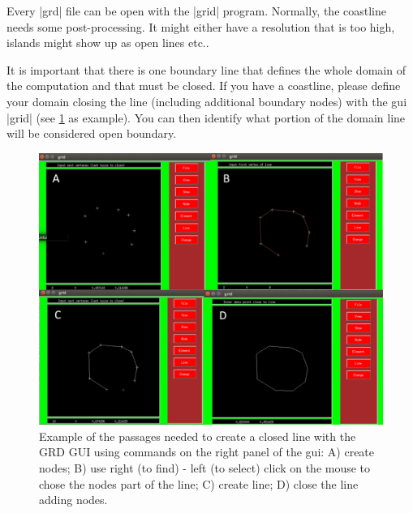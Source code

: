 
%
%
%
%
%
%
%

Every |grd| file can be open with the |grid| program.
Normally, the coastline needs some post-processing.
It might either have a resolution that is too high, islands might show up as open lines etc..

It is important that there is one boundary line that
defines the whole domain of the computation and that must be closed. If you have a
coastline, please define your domain closing the line (including additional boundary nodes) with the gui |grid| (see
\Fig\ref{line} as example).
You can then identify what portion of the domain line will be considered open boundary.

\begin{figure}[htbp]
\centering
\includegraphics[scale=0.5]{crea_linea.png}
\caption{Example of the passages needed to create a closed line with the GRD GUI using commands on the right panel of the gui: A) create nodes; B) use right (to find) - left (to select) click on the mouse to chose the nodes part of the line; C) create line; D) close the line adding nodes.}
\label{line}
\end{figure}

